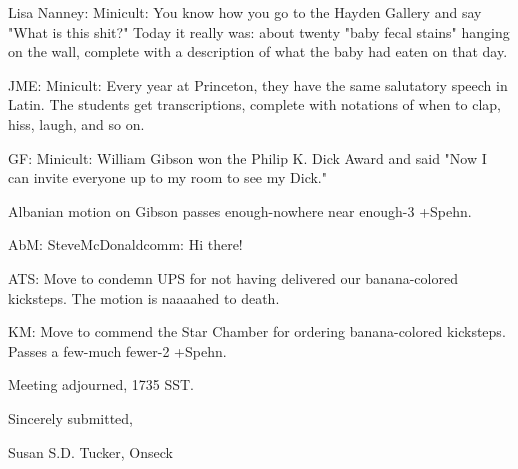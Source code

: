 \documentclass[12pt]{article}
\begin{document}
Lisa Nanney: Minicult: You know how you go to the Hayden Gallery and say "What is this shit?" Today it really was: about twenty "baby fecal stains" hanging on the wall, complete with a description of what the baby had eaten on that day.

JME: Minicult: Every year at Princeton, they have the same salutatory speech in Latin. The students get transcriptions, complete with notations of when to clap, hiss, laugh, and so on.

GF: Minicult: William Gibson won the Philip K. Dick Award and said "Now I can invite everyone up to my room to see my Dick."

Albanian motion on Gibson passes enough-nowhere near enough-3 +Spehn.

AbM: SteveMcDonaldcomm: Hi there!

ATS: Move to condemn UPS for not having delivered our banana-colored kicksteps. The motion is naaaahed to death.

KM: Move to commend the Star Chamber for ordering banana-colored kicksteps. Passes a few-much fewer-2 +Spehn.

\vspace{12pt}

\noindent
Meeting adjourned, 1735 SST.

\vspace{18pt}

\centerline{Sincerely submitted,}
\centerline{Susan S.D. Tucker, Onseck}
\end{document}
